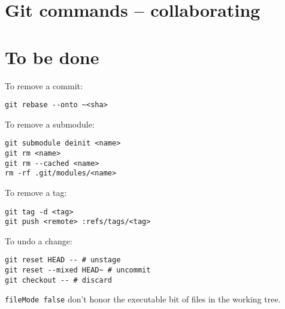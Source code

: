 \documentclass{charuun}
\begin{document}
\section{Git commands -- collaborating}





\section{To be done}
To remove a commit:
\begin{verbatim}
git rebase --onto ~<sha>
\end{verbatim}

To remove a submodule:
\begin{verbatim}
git submodule deinit <name>
git rm <name>
git rm --cached <name>
rm -rf .git/modules/<name>
\end{verbatim}

To remove a tag:
\begin{verbatim}
git tag -d <tag>
git push <remote> :refs/tags/<tag>
\end{verbatim}

To undo a change:
\begin{verbatim}
git reset HEAD -- # unstage
git reset --mixed HEAD~ # uncommit
git checkout -- # discard
\end{verbatim}


\texttt{fileMode false} don't honor the executable bit of files in the working tree.
\end{document}
